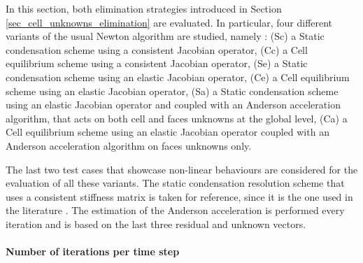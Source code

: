 In this section, both elimination strategies
introduced in Section \ref{sec_cell_unknowns_elimination} are evaluated. In particular, four different variants of the usual
Newton algorithm
are studied, namely :
(Sc) a Static condensation scheme using a consistent Jacobian operator,
(Cc) a Cell equilibrium scheme using a consistent Jacobian operator,
(Se) a Static condensation scheme using an elastic Jacobian operator,
(Ce) a Cell equilibrium scheme using an elastic Jacobian operator,
(Sa) a Static condensation scheme using an elastic Jacobian operator and coupled with an Anderson acceleration algorithm, that acts on both cell and faces unknowns at the global level,
(Ca) a Cell equilibrium scheme using an elastic Jacobian operator coupled with an Anderson acceleration algorithm on faces unknowns only.

The last two test cases that showcase non-linear behaviours are considered for the evaluation of all these variants. The static condensation resolution scheme that uses a consistent stiffness matrix is taken for reference, since it is the
one used in the literature \cite{abbas_hybrid_2019,abbas_hybrid_2018}.
The estimation of the Anderson acceleration is performed every iteration and is based on the last three residual and unknown vectors.

\paragraph{Number of iterations per time step}

